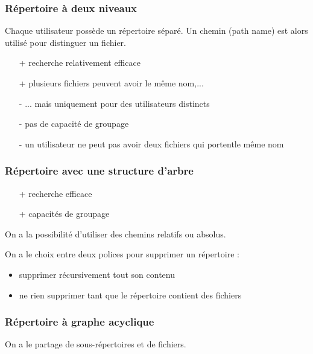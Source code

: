 		
		\subsubsection{Répertoire à deux niveaux}
		
		Chaque utilisateur possède un répertoire séparé. Un chemin (path name) est alors utilisé pour distinguer un fichier.
		
		
		\begin{itemize}
			\item[+] recherche relativement efficace
			\item[+] plusieurs fichiers peuvent avoir le même nom,... 
			\item[-] ... mais uniquement pour des utilisateurs distincts
			\item[-] pas de capacité de groupage
			\item[-] un utilisateur ne peut pas avoir deux fichiers qui portentle même nom
		\end{itemize}
		
				
		\subsubsection{Répertoire avec une structure d'arbre}
		
		
		\begin{itemize}
			\item[+] recherche efficace
			\item[+] capacités de groupage
		\end{itemize}
		
		On a la possibilité d'utiliser des chemins relatifs ou absolus.
		
		On a le choix entre deux polices pour supprimer un répertoire :
		
		\begin{itemize}
			\item supprimer récursivement tout son contenu
			\item ne rien supprimer tant que le répertoire contient des fichiers
		\end{itemize}
		
		\subsubsection{Répertoire à graphe acyclique}
		
		On a le partage de sous-répertoires et de fichiers.
		
